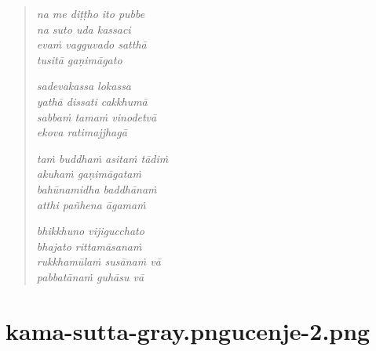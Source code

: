 

\cleartoverso

\vspace*{30mm}

\begin{verse}

\emph{na me diṭṭho ito pubbe}\\
\emph{na suto uda kassaci}\\
\emph{evaṁ vagguvado satthā}\\
\emph{tusitā gaṇimāgato}

\emph{sadevakassa lokassa\\
yathā dissati cakkhumā}\\
\emph{sabbaṁ tamaṁ vinodetvā\\
ekova ratimajjhagā}

\emph{taṁ buddhaṁ asitaṁ tādiṁ\\
akuhaṁ gaṇimāgataṁ}\\
\emph{bahūnamidha baddhānaṁ\\
atthi pañhena āgamaṁ}

\emph{bhikkhuno vijigucchato\\
bhajato rittamāsanaṁ}\\
\emph{rukkhamūlaṁ susānaṁ vā\\
pabbatānaṁ guhāsu vā}

\end{verse}


\chapter[Sāriputta Sutta]{{kama-sutta-gray.png}{ucenje-2.png}}

